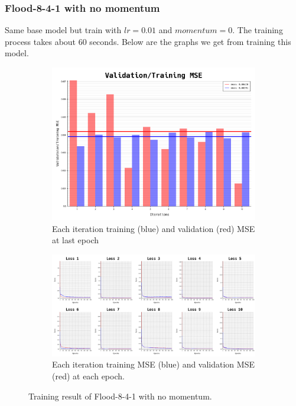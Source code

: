 \documentclass{article}
\begin{document}
\newpage
\subsubsection*{Flood-8-4-1 with no momentum}
Same base model but train with $lr = 0.01$ and $momentum = 0$.
The training process takes about $60$ seconds.
Below are the graphs we get from training this model. 
\begin{figure}[ht]
	\begin{subfigure}{\textwidth}
		\centering
		\includegraphics[scale=0.3]{flood-8-4-1_2/cv_l}
		\caption{Each iteration training (blue) and validation (red) MSE at last epoch}
		\label{fig:3a}
	\end{subfigure}
	\begin{subfigure}{\textwidth}
		\includegraphics[width=\textwidth]{flood-8-4-1_2/loss}
		\caption{Each iteration training MSE (blue) and validation MSE (red) at each epoch.}
		\label{fig:3b}
	\end{subfigure}
	\caption{Training result of Flood-8-4-1 with no momentum.}
	\label{fig:3}
\end{figure}
\FloatBarrier
\end{document}
